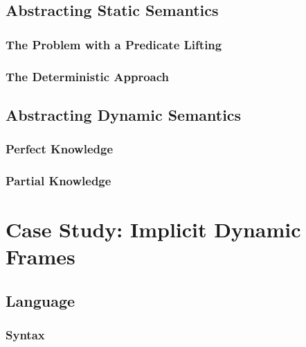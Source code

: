 \section{Abstracting Static Semantics}
\label{sec:abstracting-static-semantics}

    
    \subsection{The Problem with a Predicate Lifting}
    \label{ssec:the-problem-with}
    
    
    \subsection{The Deterministic Approach}
    \label{ssec:the-deterministic-approach}
    

\section{Abstracting Dynamic Semantics}
\label{sec:abstracting-dynamic-semantics}

    
    \subsection{Perfect Knowledge}
    \label{ssec:perfect-knowledge}
    
    
    \subsection{Partial Knowledge}
    \label{ssec:atomic--knowledge}
    



\chapter{Case Study: Implicit Dynamic Frames}
\label{ch:case-study--implicit}


\section{Language}
\label{sec:language}


    \subsection{Syntax}
    \label{sec:syntax}
    
    
